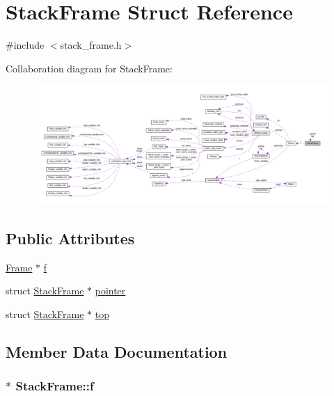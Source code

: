 \hypertarget{structStackFrame}{}\section{Stack\+Frame Struct Reference}
\label{structStackFrame}


{\ttfamily \#include $<$stack\+\_\+frame.\+h$>$}



Collaboration diagram for Stack\+Frame\+:
\nopagebreak
\begin{figure}[H]
\begin{center}
\leavevmode
\includegraphics[width=350pt]{structStackFrame__coll__graph}
\end{center}
\end{figure}
\subsection*{Public Attributes}
\begin{DoxyCompactItemize}
\item 
\hyperlink{structFrame}{Frame} $\ast$ \hyperlink{structStackFrame_a344a354f24d9c4b6c805cd0a029100b9}{f}
\item 
struct \hyperlink{structStackFrame}{Stack\+Frame} $\ast$ \hyperlink{structStackFrame_aae670075795a607599420fd8b5181292}{pointer}
\item 
struct \hyperlink{structStackFrame}{Stack\+Frame} $\ast$ \hyperlink{structStackFrame_a9f0df83101cacbe812d0d4b3c6e08494}{top}
\end{DoxyCompactItemize}


\subsection{Member Data Documentation}
\subsubsection[{\texorpdfstring{f}{f}}]{$\ast$ Stack\+Frame\+::f}\hypertarget{structStackFrame_a344a354f24d9c4b6c805cd0a029100b9}{}\label{structStackFrame_a344a354f24d9c4b6c805cd0a029100b9}
